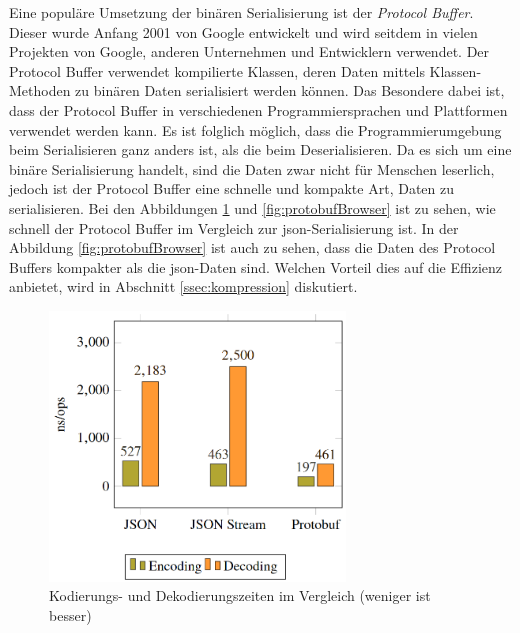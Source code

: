 Eine populäre Umsetzung der binären Serialisierung ist der \textit{Protocol Buffer}. Dieser wurde Anfang 2001 von Google entwickelt und wird seitdem in vielen Projekten von Google, anderen Unternehmen und Entwicklern verwendet. Der Protocol Buffer verwendet kompilierte Klassen, deren Daten mittels Klassen-Methoden zu binären Daten serialisiert werden können. Das Besondere dabei ist, dass der Protocol Buffer in verschiedenen Programmiersprachen und Plattformen verwendet werden kann. Es ist folglich möglich, dass die Programmierumgebung beim Serialisieren ganz anders ist, als die beim Deserialisieren. Da es sich um eine binäre Serialisierung handelt, sind die Daten zwar nicht für Menschen leserlich, jedoch ist der Protocol Buffer eine schnelle und kompakte Art, Daten zu serialisieren. Bei den Abbildungen \ref{fig:protobufTime} und \ref{fig:protobufBrowser} ist zu sehen, wie schnell der Protocol Buffer im Vergleich zur \ac{json}-Serialisierung ist.  In der Abbildung \ref{fig:protobufBrowser} ist auch zu sehen, dass die Daten des Protocol Buffers kompakter als die \ac{json}-Daten sind. Welchen Vorteil dies auf die Effizienz anbietet, wird in Abschnitt \ref{ssec:kompression} diskutiert.\cite{currier2022protocol}

\begin{figure}[htp]
    \centering
    \includegraphics[width=0.7\textwidth]{images/protobuf_time.png}
    \caption{Kodierungs- und Dekodierungszeiten im Vergleich (weniger ist besser) \cite{currier2022protocol}}
    \label{fig:protobufTime}
\end{figure}

